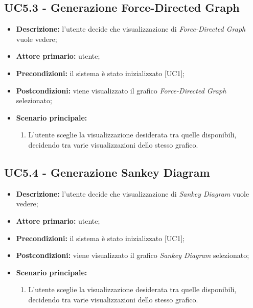 \subsection{UC5.3 - Generazione Force-Directed Graph}
\begin{itemize}
    \item \textbf{Descrizione:} l'utente decide che visualizzazione di \textit{Force-Directed Graph} vuole vedere;
    \item \textbf{Attore primario:} utente;
    \item \textbf{Precondizioni:} il sistema è stato inizializzato [UC1];
    \item \textbf{Postcondizioni:} viene visualizzato il grafico \textit{Force-Directed Graph} selezionato;
    \item \textbf{Scenario principale:}
    \begin{enumerate}
      \item L'utente sceglie la visualizzazione desiderata tra quelle disponibili, decidendo tra varie visualizzazioni dello stesso grafico.
    \end{enumerate}
\end{itemize}

\subsection{UC5.4 - Generazione Sankey Diagram}
\begin{itemize}
    \item \textbf{Descrizione:} l'utente decide che visualizzazione di \textit{Sankey Diagram} vuole vedere;
    \item \textbf{Attore primario:} utente;
    \item \textbf{Precondizioni:} il sistema è stato inizializzato [UC1];
    \item \textbf{Postcondizioni:} viene visualizzato il grafico \textit{Sankey Diagram} selezionato;
    \item \textbf{Scenario principale:}
    \begin{enumerate}
      \item L'utente sceglie la visualizzazione desiderata tra quelle disponibili, decidendo tra varie visualizzazioni dello stesso grafico.
    \end{enumerate}
\end{itemize}

